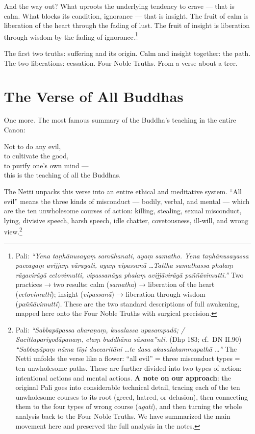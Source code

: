 And the way out? What uproots the underlying tendency to crave --- that is calm. What blocks its condition, ignorance --- that is insight. The fruit of calm is liberation of the heart through the fading of lust. The fruit of insight is liberation through wisdom by the fading of ignorance.\footnote{Pali: \textit{``Yena taṇhānusayaṃ samūhanati, ayaṃ samatho. Yena taṇhānusayassa paccayaṃ avijjaṃ vārayati, ayaṃ vipassanā \ldots Tattha samathassa phalaṃ rāgavirāgā cetovimutti, vipassanāya phalaṃ avijjāvirāgā paññāvimutti.''} Two practices → two results: calm (\textit{samatha}) → liberation of the heart (\textit{cetovimutti}); insight (\textit{vipassanā}) → liberation through wisdom (\textit{paññāvimutti}). These are the two standard descriptions of full awakening, mapped here onto the Four Noble Truths with surgical precision.}

The first two truths: suffering and its origin. Calm and insight together: the path. The two liberations: cessation. Four Noble Truths. From a verse about a tree.

\section*{The Verse of All Buddhas}

One more. The most famous summary of the Buddha's teaching in the entire Canon:

\begin{versebox}
Not to do any evil,\\
to cultivate the good,\\
to purify one's own mind ---\\
this is the teaching of all the Buddhas.
\end{versebox}

The Netti unpacks this verse into an entire ethical and meditative system. ``All evil'' means the three kinds of misconduct --- bodily, verbal, and mental --- which are the ten unwholesome courses of action: killing, stealing, sexual misconduct, lying, divisive speech, harsh speech, idle chatter, covetousness, ill-will, and wrong view.\footnote{Pali: \textit{``Sabbapāpassa akaraṇaṃ, kusalassa upasampadā; / Sacittapariyodāpanaṃ, etaṃ buddhāna sāsana''nti.} (Dhp 183; cf.\ DN II.90) \textit{``Sabbapāpaṃ nāma tīṇi duccaritāni \ldots te dasa akusalakammapathā \ldots''} The Netti unfolds the verse like a flower: ``all evil'' = three misconduct types = ten unwholesome paths. These are further divided into two types of action: intentional actions and mental actions. \textbf{A note on our approach}: the original Pali goes into considerable technical detail, tracing each of the ten unwholesome courses to its root (greed, hatred, or delusion), then connecting them to the four types of wrong course (\textit{agati}), and then turning the whole analysis back to the Four Noble Truths. We have summarized the main movement here and preserved the full analysis in the notes.}

